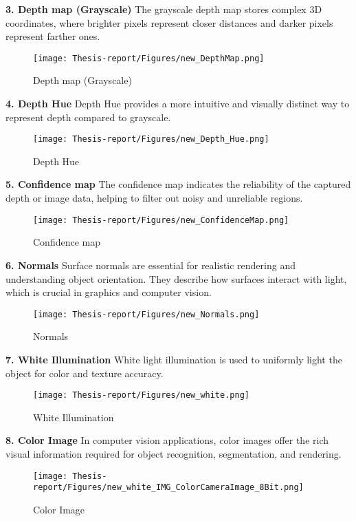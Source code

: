 \documentclass[12pt]{article}
\begin{document}
\noindent\textbf{3. Depth map (Grayscale)} The grayscale depth map stores complex 3D coordinates, where brighter pixels represent closer distances and darker pixels represent farther ones.
\begin{figure}[H]
    \centering
    \texttt{[image: Thesis-report/Figures/new\_DepthMap.png]}
    \caption{Depth map (Grayscale)}
    \label{fig:depthmap_gray}
\end{figure}

\noindent\textbf{4. Depth Hue} Depth Hue provides a more intuitive and visually distinct way to represent depth compared to grayscale.
\begin{figure}[H]
    \centering
    \texttt{[image: Thesis-report/Figures/new\_Depth\_Hue.png]}
    \caption{Depth Hue}
    \label{fig:depth_hue}
\end{figure}

\noindent\textbf{5. Confidence map} The confidence map indicates the reliability of the captured depth or image data, helping to filter out noisy and unreliable regions.
\begin{figure}[H]
    \centering
    \texttt{[image: Thesis-report/Figures/new\_ConfidenceMap.png]}
    \caption{Confidence map}
    \label{fig:confidence_map}
\end{figure}

\noindent\textbf{6. Normals} Surface normals are essential for realistic rendering and understanding object orientation. They describe how surfaces interact with light, which is crucial in graphics and computer vision.
\begin{figure}[H]
    \centering
    \texttt{[image: Thesis-report/Figures/new\_Normals.png]}
    \caption{Normals}
    \label{fig:normals}
\end{figure}

\noindent\textbf{7. White Illumination} White light illumination is used to uniformly light the object for color and texture accuracy.
\begin{figure}[H]
    \centering
    \texttt{[image: Thesis-report/Figures/new\_white.png]}
    \caption{White Illumination}
    \label{fig:white}
\end{figure}

\noindent\textbf{8. Color Image} In computer vision applications, color images offer the rich visual information required for object recognition, segmentation, and rendering.
\begin{figure}[H]
    \centering
    \texttt{[image: Thesis-report/Figures/new\_white\_IMG\_ColorCameraImage\_8Bit.png]}
    \caption{Color Image}
    \label{fig:color_image}
\end{figure}
\newpage
\end{document}
